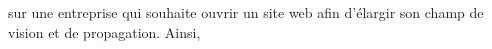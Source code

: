 \documentclass[a4paper, 11pt, french]{report}
\begin{document}
                                                                                                                            sur
                                                                                                                            une
                                                                                                                            entreprise
                                                                                                                            qui
                                                                                                                            souhaite
                                                                                                                            ouvrir
                                                                                                                            un
                                                                                                                            site
                                                                                                                            web
                                                                                                                            afin
                                                                                                                            d'élargir
                                                                                                                            son
                                                                                                                            champ
                                                                                                                            de
                                                                                                                            vision
                                                                                                                            et
                                                                                                                            de
                                                                                                                            propagation.
                                                                                                                                \newline
                                                                                                                                 Ainsi,
\end{document}
